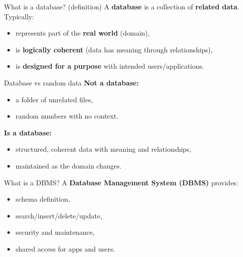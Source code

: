 \documentclass[10pt,aspectratio=169]{beamer}
\begin{document}
\begin{frame}{What is a database? (definition)}
A \textbf{database} is a collection of \textbf{related data}. Typically:
\begin{itemize}
  \item represents part of the \textbf{real world} (domain),
  \item is \textbf{logically coherent} (data has meaning through relationships),
  \item is \textbf{designed for a purpose} with intended users/applications.
\end{itemize}
\end{frame}

\begin{frame}{Database vs random data}
\textbf{Not a database:}
\begin{itemize}
  \item a folder of unrelated files,
  \item random numbers with no context.
\end{itemize}

\vspace{0.5em}
\textbf{Is a database:}
\begin{itemize}
  \item structured, coherent data with meaning and relationships,
  \item maintained as the domain changes.
\end{itemize}
\end{frame}

\begin{frame}{What is a DBMS?}
A \textbf{Database Management System (DBMS)} provides:
\begin{itemize}
  \item schema definition,
  \item search/insert/delete/update,
  \item security and maintenance,
  \item shared access for apps and users.
\end{itemize}
\end{frame}
\end{document}
